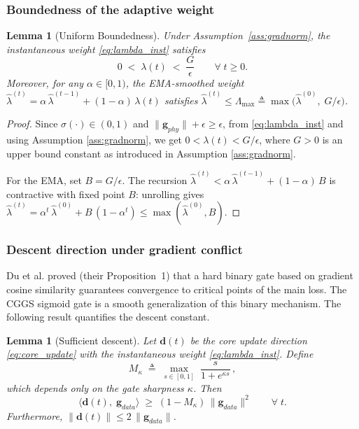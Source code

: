 \documentclass[11pt]{article}
\newtheorem{lemma}[thm]{Lemma}
\begin{document}
\subsubsection{Boundedness of the adaptive weight}

\begin{lemma}[Uniform Boundedness]\label{lem:bounded}
Under Assumption~\ref{ass:gradnorm}, the instantaneous weight \eqref{eq:lambda_inst} satisfies
\[
0 \;<\; \lambda(t) \;<\; \frac{G}{\epsilon} \qquad \forall\; t \geq 0.
\]
Moreover, for any $\alpha \in [0,1)$, the EMA-smoothed weight $\hat{\lambda}^{(t)} = \alpha\,\hat{\lambda}^{(t-1)} + (1-\alpha)\,\lambda(t)$ satisfies $\hat{\lambda}^{(t)} \leq \Lambda_{\max} \triangleq \max\!\bigl(\hat{\lambda}^{(0)},\; G/\epsilon\bigr)$.
\end{lemma}

\begin{proof}
Since $\sigma(\cdot) \in (0,1)$ and $\|\mathbf{g}_{phy}\| + \epsilon \geq \epsilon$, from \eqref{eq:lambda_inst} and using Assumption \ref{ass:gradnorm}, we get  $0 < \lambda(t) < G/\epsilon$, where $G>0$ is an upper bound constant as introduced in Assumption \ref{ass:gradnorm}.

For the EMA, set $B = G/\epsilon$. The recursion $\hat{\lambda}^{(t)} < \alpha\,\hat{\lambda}^{(t-1)} + (1-\alpha)\,B$ is contractive with fixed point $B$: unrolling gives $\hat{\lambda}^{(t)} = \alpha^{t}\,\hat{\lambda}^{(0)} + B\,(1-\alpha^{t}) \leq \max(\hat{\lambda}^{(0)}, B)$.
\end{proof}

\subsubsection{Descent direction under gradient conflict}

Du et al. \cite{du2018adapting} proved (their Proposition~1) that a hard binary gate based on gradient cosine similarity guarantees convergence to critical points of the main loss. The CGGS sigmoid gate is a smooth generalization of this binary mechanism. The following result quantifies the descent constant.

\begin{lemma}[Sufficient descent]\label{lem:descent}
Let $\mathbf{d}(t)$ be the core update direction \eqref{eq:core_update} with the instantaneous weight \eqref{eq:lambda_inst}. Define
\[
M_\kappa \;\triangleq\; \max_{s \in [0,1]}\; \frac{s}{1 + e^{\kappa s}}\,,
\]
which depends only on the gate sharpness $\kappa$. Then
\[
\bigl\langle \mathbf{d}(t),\; \mathbf{g}_{data} \bigr\rangle \;\geq\; (1 - M_\kappa)\,\|\mathbf{g}_{data}\|^{2} \qquad \forall\; t.
\]
Furthermore, $\|\mathbf{d}(t)\| \leq 2\,\|\mathbf{g}_{data}\|$.
\end{lemma}
\end{document}
